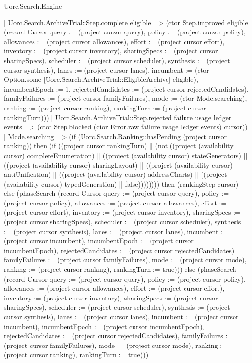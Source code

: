 \begin{lexlean}{Uorc.Search.Engine}
\begin{semanticmodule}
{      | Uorc.Search.ArchiveTrial::Step.complete eligible => (ctor Step.improved eligible (record Cursor {query := (project cursor query), policy := (project cursor policy), allowances := (project cursor allowances), effort := (project cursor effort), inventory := (project cursor inventory), sharingSpecs := (project cursor sharingSpecs), scheduler := (project cursor scheduler), synthesis := (project cursor synthesis), lanes := (project cursor lanes), incumbent := (ctor Option.some [Uorc.Search.ArchiveTrial::EligibleArchive] eligible), incumbentEpoch := 1, rejectedCandidates := (project cursor rejectedCandidates), familyFailures := (project cursor familyFailures), mode := (ctor Mode.searching), ranking := (project cursor ranking), rankingTurn := (project cursor rankingTurn)}))
      | Uorc.Search.ArchiveTrial::Step.rejected failure usage ledger events => (ctor Step.blocked (ctor Error.raw failure usage ledger events) cursor))
    | Mode.searching => (if (Uorc.Search.Ranking::hasPending (project cursor ranking)) then (if ((project cursor rankingTurn) || (not ((project (availability cursor) completeEnumeration) || ((project (availability cursor) stateGenerators) || ((project (availability cursor) sharingLayout) || ((project (availability cursor) antiUnification) || ((project (availability cursor) addressCharts) || ((project (availability cursor) typedGeneration) || false)))))))) then (rankingStep cursor) else (phaseSearch (record Cursor {query := (project cursor query), policy := (project cursor policy), allowances := (project cursor allowances), effort := (project cursor effort), inventory := (project cursor inventory), sharingSpecs := (project cursor sharingSpecs), scheduler := (project cursor scheduler), synthesis := (project cursor synthesis), lanes := (project cursor lanes), incumbent := (project cursor incumbent), incumbentEpoch := (project cursor incumbentEpoch), rejectedCandidates := (project cursor rejectedCandidates), familyFailures := (project cursor familyFailures), mode := (project cursor mode), ranking := (project cursor ranking), rankingTurn := true}))) else (phaseSearch (record Cursor {query := (project cursor query), policy := (project cursor policy), allowances := (project cursor allowances), effort := (project cursor effort), inventory := (project cursor inventory), sharingSpecs := (project cursor sharingSpecs), scheduler := (project cursor scheduler), synthesis := (project cursor synthesis), lanes := (project cursor lanes), incumbent := (project cursor incumbent), incumbentEpoch := (project cursor incumbentEpoch), rejectedCandidates := (project cursor rejectedCandidates), familyFailures := (project cursor familyFailures), mode := (project cursor mode), ranking := (project cursor ranking), rankingTurn := true})))
}
\end{semanticmodule}
\end{lexlean}
